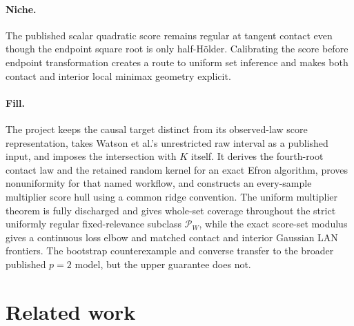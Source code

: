 \documentclass{article}
\begin{document}
\paragraph{Niche.} The published scalar quadratic score remains regular at tangent contact even though the endpoint square root is only half-Hölder. Calibrating the score before endpoint transformation creates a route to uniform set inference and makes both contact and interior local minimax geometry explicit.

\paragraph{Fill.} The project keeps the causal target distinct from its observed-law score representation, takes Watson et al.'s unrestricted raw interval as a published input, and imposes the intersection with \(K\) itself. It derives the fourth-root contact law and the retained random kernel for an exact Efron algorithm, proves nonuniformity for that named workflow, and constructs an every-sample multiplier score hull using a common ridge convention. The uniform multiplier theorem is fully discharged and gives whole-set coverage throughout the strict uniformly regular fixed-relevance subclass \(\mathcal P_W\), while the exact score-set modulus gives a continuous loss elbow and matched contact and interior Gaussian LAN frontiers. The bootstrap counterexample and converse transfer to the broader published \(p=2\) model, but the upper guarantee does not.

\section{Related work}
\end{document}
